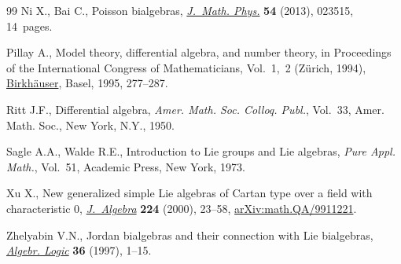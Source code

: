 \documentclass[pdftex]{sigma}
\numberwithin{equation}{section}
\begin{document}
\begin{thebibliography}{99}
Ni X., Bai C., Poisson bialgebras, \href{https://doi.org/10.1063/1.4792668}{\textit{J.~Math. Phys.}} \textbf{54} (2013),
 023515, 14~pages.

Pillay A., Model theory, differential algebra, and number theory, in
 Proceedings of the {I}nternational {C}ongress of {M}athematicians,
 {V}ol.~1,~2 ({Z}\"urich, 1994), \href{https://doi.org/10.1007/978-3-0348-9078-6_21}{Birkh\"auser}, Basel, 1995, 277--287.

Ritt J.F., Differential algebra, \textit{Amer. Math. Soc. Colloq. Publ.},
 Vol.~33, Amer. Math. Soc., New York, N.Y., 1950.

Sagle A.A., Walde R.E., Introduction to {L}ie groups and {L}ie algebras,
 \textit{Pure Appl. Math.}, Vol.~51, Academic Press, New York, 1973.

Xu X., New generalized simple {L}ie algebras of {C}artan type over a field with
 characteristic {$0$}, \href{https://doi.org/10.1006/jabr.1998.8083}{\textit{J.~Algebra}} \textbf{224} (2000), 23--58,
 \href{https://arxiv.org/abs/math.QA/9911221}{arXiv:math.QA/9911221}.

Zhelyabin V.N., Jordan bialgebras and their connection with {L}ie bialgebras,
 \href{https://doi.org/10.1007/BF02671949}{\textit{Algebr. Logic}} \textbf{36} (1997), 1--15.

\end{thebibliography}\LastPageEnding
\end{document}
